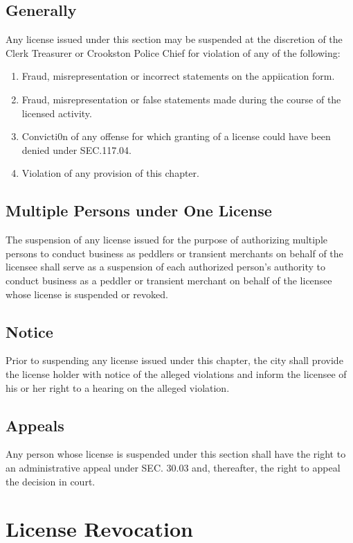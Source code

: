 \subsection{Generally}
Any license issued under this section may be suspended at the discretion of the Clerk Treasurer or Crookston Police Chief for violation of any of the following:
\begin{enumerate}[{\indent}1)]
    \item Fraud, misrepresentation or incorrect statements on the appiication form.
    \item Fraud, misrepresentation or false statements made during the course of the licensed activity.
    \item Convicti0n of any offense for which granting of a license could have been denied under SEC.117.04.
    \item Violation of any provision of this chapter.
\end{enumerate}
\subsection{Multiple Persons under One License}
The suspension of any license issued for the purpose of authorizing multiple persons to conduct business as peddlers or transient merchants on behalf of the licensee shall serve as a suspension of each authorized person's authority to conduct business as a peddler or transient merchant on behalf of the licensee whose license is suspended or revoked.
\subsection{Notice}
Prior to suspending any license issued under this chapter, the city shall provide the license holder with notice of the alleged violations and inform the licensee of his or her right to a hearing on the alleged violation.
\subsection{Appeals}
Any person whose license is suspended under this section shall have the right to an administrative appeal under SEC. 30.03 and, thereafter, the right to appeal the decision in court.

\section{License Revocation}
